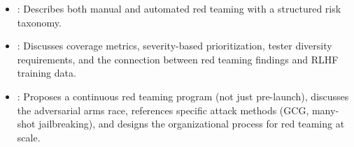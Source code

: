 \begin{interviewq}

\goodgreat
\begin{itemize}
    \item {}: Describes both manual and automated red teaming
    with a structured risk taxonomy.
    \item {}: Discusses coverage metrics, severity-based
    prioritization, tester diversity requirements, and the connection between
    red teaming findings and RLHF training data.
    \item {}: Proposes a continuous red teaming program (not
    just pre-launch), discusses the adversarial arms race, references specific
    attack methods (GCG, many-shot jailbreaking), and designs the
    organizational process for red teaming at scale.
\end{itemize}

\end{interviewq}

\vspace{0.5em}

